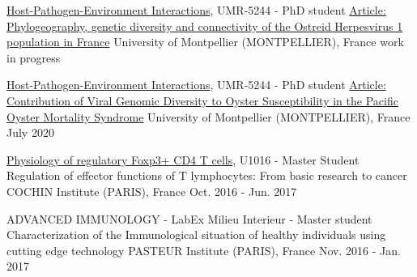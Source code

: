 

\begin{cventries}

  \cventry
    {\href{http://ihpe.univ-perp.fr/}{Host-Pathogen-Environment Interactions}, UMR-5244 - PhD student} %
    {\href{}{Article: Phylogeography, genetic diversity and connectivity of the Ostreid Herpesvirus 1 population in France}} %
    {University of Montpellier (MONTPELLIER), France} %
    {work in progress} %
    {
      \begin{cvitems} %
      \end{cvitems}
    }

  \cventry
    {\href{http://ihpe.univ-perp.fr/}{Host-Pathogen-Environment Interactions}, UMR-5244 - PhD student} %
    {\href{https://doi.org/10.3389/fmicb.2020.01579}{Article: Contribution of Viral Genomic Diversity to Oyster Susceptibility in the Pacific Oyster Mortality Syndrome}} %
    {University of Montpellier (MONTPELLIER), France} %
    {July 2020} %
    {
      \begin{cvitems} %
      \end{cvitems}
    }

  \cventry
    {\href{https://www.institutcochin.fr/departments/3i/team-lucas/physiology-of-regulatory-foxp3-cd4-t-cells}{Physiology of regulatory Foxp3+ CD4 T cells}, U1016 - Master Student}%
    {Regulation of effector functions of T lymphocytes: From basic research to cancer} %
    {COCHIN Institute (PARIS), France} %
    {Oct. 2016 - Jun. 2017} %
    {
      \begin{cvitems} %
      \end{cvitems}
    }

  \cventry
    {ADVANCED IMMUNOLOGY - LabEx Milieu Interieur - Master student} %
    {Characterization of the Immunological situation of healthy individuals using cutting edge technology} %
    {PASTEUR Institute (PARIS), France} %
    {Nov. 2016 - Jan. 2017} %
    {
      \begin{cvitems} %
      \end{cvitems}
    }


\end{cventries}
